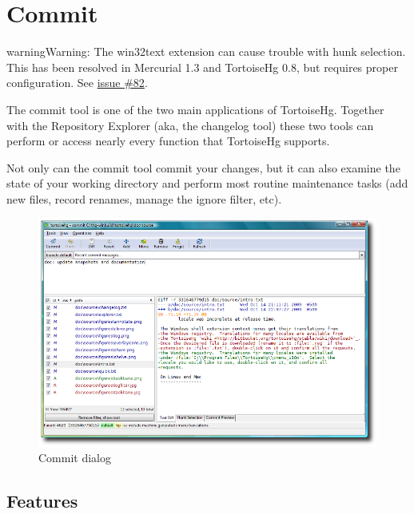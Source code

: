\documentclass[letterpaper,10pt,english]{manual}
\begin{document}
\resetcurrentobjects
\hypertarget{--doc-commit}{}

\section{Commit}
\hypertarget{module-commit.dialog}{}
\begin{notice}{warning}{Warning:}
The win32text extension can cause trouble with hunk selection.  This
has been resolved in Mercurial 1.3 and TortoiseHg 0.8, but requires
proper configuration. See
\href{http://bitbucket.org/tortoisehg/stable/issue/82/}{issue \#82}.
\end{notice}

The commit tool is one of the two main applications of TortoiseHg.
Together with the Repository Explorer (aka, the changelog tool) these
two tools can perform or access nearly every function that TortoiseHg
supports.

Not only can the commit tool commit your changes, but it can also
examine the state of your working directory and perform most routine
maintenance tasks (add new files, record renames, manage the ignore
filter, etc).
\begin{figure}[htbp]
\centering

\includegraphics{commit.png}
\caption{Commit dialog}\end{figure}


\subsection{Features}
\end{document}
